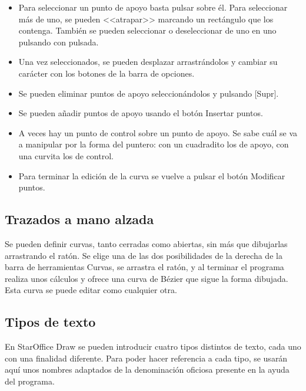 \begin{itemize}
\item Para seleccionar un punto de apoyo basta pulsar sobre él. 
Para seleccionar más de uno, se pueden <<atrapar>> marcando un 
rectángulo que los contenga. También se pueden seleccionar o 
deseleccionar de uno en uno pulsando con  pulsada.

\item Una vez seleccionados, se pueden desplazar arrastrándolos 
y cambiar su carácter con los botones de la barra de opciones.

\item Se pueden eliminar puntos de apoyo seleccionándolos y 
pulsando [Supr].

\item Se pueden añadir puntos de apoyo usando el botón Insertar 
puntos.

\item A veces hay un punto de control sobre un punto de apoyo. 
Se sabe cuál se va a manipular por la forma del puntero: con un 
cuadradito los de apoyo, con una curvita los de control.

\item Para terminar la edición de la curva se vuelve a pulsar 
el botón Modificar puntos.
\end{itemize}

\subsection{Trazados a mano alzada}

Se pueden definir curvas, tanto cerradas como abiertas, sin más que
dibujarlas arrastrando el ratón. Se elige una de las dos posibilidades
de la derecha de la barra de herramientas Curvas, se arrastra el
ratón, y al terminar el programa realiza unos cálculos y ofrece una
curva de Bézier que sigue la forma dibujada. Esta curva se puede
editar como cualquier otra.

\subsection{Tipos de texto}

En StarOffice Draw se pueden introducir cuatro tipos distintos de
texto, cada uno con una finalidad diferente. Para poder hacer
referencia a cada tipo, se usarán aquí unos nombres adaptados de la
denominación oficiosa presente en la ayuda del programa.

